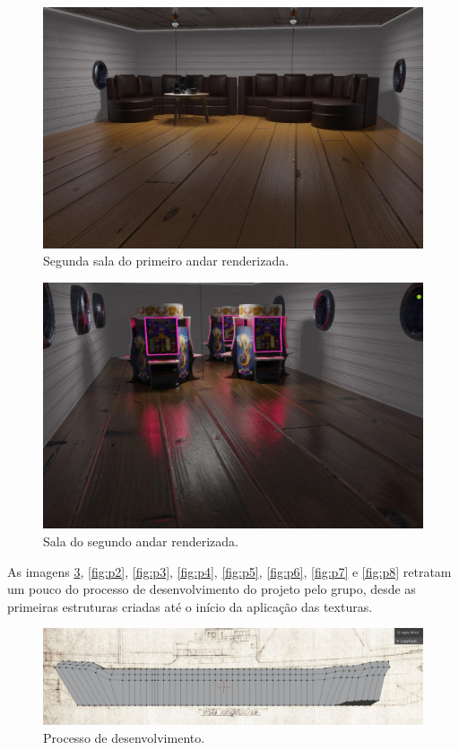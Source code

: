 \begin{figure}[!h]
    \centering
    \includegraphics[scale=0.5]{imagens/sala2.jpg}
    \caption{Segunda sala do primeiro andar renderizada.}
    \label{fig:sala2}
\end{figure}


\begin{figure}[!h]
    \centering
    \includegraphics[scale=0.5]{imagens/sala.jpg}
    \caption{Sala do segundo andar renderizada.}
    \label{fig:niquel}
\end{figure}

As imagens \ref{fig:p1}, \ref{fig:p2}, \ref{fig:p3}, \ref{fig:p4}, \ref{fig:p5}, \ref{fig:p6}, \ref{fig:p7} e \ref{fig:p8} retratam um pouco do processo de desenvolvimento do projeto pelo grupo, desde as primeiras estruturas criadas até o início da aplicação das texturas.

\begin{figure}[!h]
    \centering
    \includegraphics[scale=0.4]{imagens/p1.jpg}
    \caption{Processo de desenvolvimento.}
    \label{fig:p1}
\end{figure}

